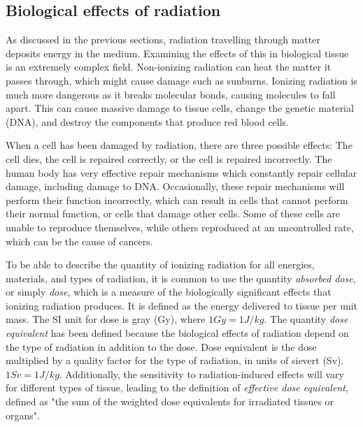 \documentclass[../main/thesis.tex]{subfiles}
\begin{document}
\subsection{Biological effects of radiation}
\label{t-bio}
As discussed in the previous sections, radiation travelling through matter deposits energy in the medium. Examining the effects of this in biological tissue is an extremely complex field. Non-ionizing radiation can heat the matter it passes through, which might cause damage such as sunburns. Ionizing radiation is much more dangerous as it breaks molecular bonds, causing molecules to fall apart. This can cause massive damage to tissue cells, change the genetic material (DNA), and destroy the components that produce red blood cells. \citep[chap. 43]{UniversityPhysics} 

When a cell has been damaged by radiation, there are three possible effects: The cell dies, the cell is repaired correctly, or the cell is repaired incorrectly. The human body has very effective repair mechanisms which constantly repair cellular damage, including damage to DNA. Occasionally, these repair mechanisms will perform their function incorrectly, which can result in cells that cannot perform their normal function, or cells that damage other cells. Some of these cells are unable to reproduce themselves, while others reproduced at an uncontrolled rate, which can be the cause of cancers.\citetext{\citeauthor{jlab}}

To be able to describe the quantity of ionizing radiation for all energies, materials, and types of radiation, it is common to use the quantity \textit{absorbed dose}, or simply \textit{dose}, which is a measure of the biologically significant effects that ionizing radiation produces. It is defined as the energy delivered to tissue per unit mass. The SI unit for dose is gray (Gy), where $1 Gy = 1 J/kg$. The quantity \textit{dose equivalent} has been defined because the biological effects of radiation depend on the type of radiation in addition to the dose. Dose equivalent is the dose multiplied by a quality factor for the type of radiation, in units of sievert (Sv). $1 Sv = 1 J/kg$. Additionally, the sensitivity to radiation-induced effects will vary for different types of tissue, leading to the definition of \textit{effective dose equivalent}, defined as "the sum of the weighted dose equivalents for irradiated tissues or organs". \citep[chap. 8 $\&$ 16]{Khan} 


\end{document}
